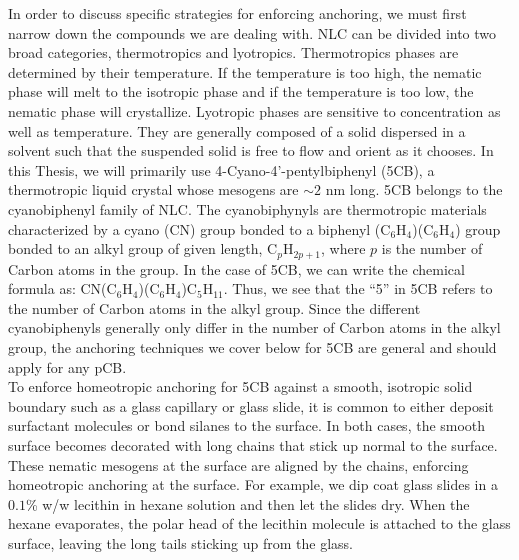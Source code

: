 In order to discuss specific strategies for enforcing anchoring, we must first narrow down the compounds we are dealing with.
NLC can be divided into two broad categories, thermotropics and lyotropics.
Thermotropics phases are determined by their temperature.
If the temperature is too high, the nematic phase will melt to the isotropic phase and if the temperature is too low, the nematic phase will crystallize.
Lyotropic phases are sensitive to concentration as well as temperature.
They are generally composed of a solid dispersed in a solvent such that the suspended solid is free to flow and orient as it chooses.
In this Thesis, we will primarily use 4-Cyano-4'-pentylbiphenyl (5CB), a thermotropic liquid crystal whose mesogens are $\sim 2$ nm long.\@
5CB belongs to the cyanobiphenyl family of NLC.
The cyanobiphynyls are thermotropic materials characterized by a cyano (CN) group  bonded to a biphenyl (C$_6$H$_4$)(C$_6$H$_4$) group bonded to an alkyl group of given length, C$_p$H$_{2p+1}$, where $p$ is the number of Carbon atoms in the group.
In the case of 5CB, we can write the chemical formula as: CN(C$_6$H$_4$)(C$_6$H$_4$)C$_5$H$_{11}$.
Thus, we see that the ``5'' in 5CB refers to the number of Carbon atoms in the alkyl group.
Since the different cyanobiphenyls generally only differ in the number of Carbon atoms in the alkyl group, the anchoring techniques we cover below for 5CB are general and should apply for any pCB. \\

To enforce homeotropic anchoring for 5CB against a smooth, isotropic solid boundary such as a glass capillary or glass slide, it is common to either deposit surfactant molecules or bond silanes to the surface.
In both cases, the smooth surface becomes decorated with long chains that stick up normal to the surface.
These nematic mesogens at the surface are aligned by the chains, enforcing homeotropic anchoring at the surface.
For example, we dip coat glass slides in a $0.1$\% w/w lecithin in hexane solution and then let the slides dry.
When the hexane evaporates, the polar head of the lecithin molecule is attached to the glass surface, leaving the long tails sticking up from the glass.\\

